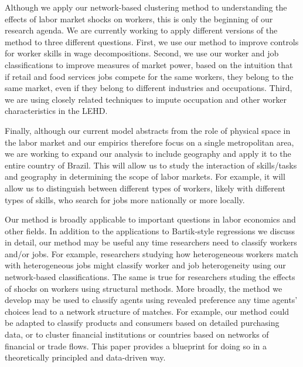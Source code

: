 \documentclass[12pt]{article}
\theoremstyle{definition}
\theoremstyle{plain}
\begin{document}

Although we apply our network-based clustering method to understanding the effects of labor market shocks on workers, this is only the beginning of our research agenda. We are currently working to apply different versions of the method to three different questions. First, we use our method to improve controls for worker skills in wage decompositions. Second, we use our worker and job classifications to improve measures of market power, based on the intuition that if retail and food services jobs compete for the same workers, they belong to the same market, even if they belong to different industries and occupations. Third, we are using closely related techniques to impute occupation and other worker characteristics in the LEHD.

Finally, although our current model abstracts from the role of physical space in the labor market and our empirics therefore focus on a single metropolitan area, we are working to expand our analysis to include geography and apply it to the entire country of Brazil. This will allow us to study the interaction of skills/tasks and geography in determining the scope of labor markets. For example, it will allow us to distinguish between different types of workers, likely with different types of skills, who search for jobs more nationally or more locally. 

Our method is broadly applicable to important questions in labor economics and other fields. In addition to the applications to Bartik-style regressions we discuss in detail, our method may be useful any time researchers need to classify workers and/or jobs. For example, researchers studying how heterogeneous workers match with heterogeneous jobs might classify worker and job heterogeneity using our network-based classifications. The same is true for researchers studing the effects of shocks on workers using structural methods. More broadly, the method we develop may be used to classify agents using revealed preference any time agents' choices lead to a network structure of matches. For example, our method could be adapted to classify products and consumers based on detailed purchasing data, or to cluster financial institutions or countries based on networks of financial or trade flows. This paper provides a blueprint for doing so in a theoretically principled and data-driven way. 
\end{document}
